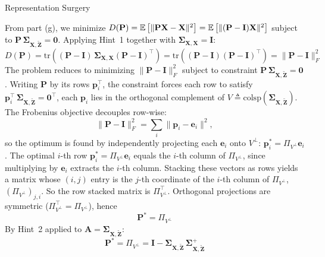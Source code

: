 \begin{question}{Representation Surgery}
\begin{subquestion}
From part (g), we minimize $D(\mathbf{P}) = \expectation\left[\|\mathbf{P}\mathbf{X} - \mathbf{X}\|^2\right] = \expectation\left[\|(\mathbf{P} - \mathbf{I})\mathbf{X}\|^2\right]$ subject to $\mathbf{P}\, \boldsymbol{\Sigma}_{\mathbf{X}, \widetilde{\mathbf{Z}}} = \mathbf{0}$. Applying Hint~1 together with $\boldsymbol{\Sigma}_{\mathbf{X}, \mathbf{X}} = \mathbf{I}$:
\begin{equation}
    D(\mathbf{P}) = \mathrm{tr}\!\left((\mathbf{P} - \mathbf{I})\, \boldsymbol{\Sigma}_{\mathbf{X}, \mathbf{X}} (\mathbf{P} - \mathbf{I})^\top\right) = \mathrm{tr}\!\left((\mathbf{P} - \mathbf{I})(\mathbf{P} - \mathbf{I})^\top\right) = \|\mathbf{P} - \mathbf{I}\|_F^2
\end{equation}
The problem reduces to minimizing $\|\mathbf{P} - \mathbf{I}\|_F^2$ subject to constraint $\mathbf{P}\, \boldsymbol{\Sigma}_{\mathbf{X}, \widetilde{\mathbf{Z}}} = \mathbf{0}$.
Writing $\mathbf{P}$ by its rows $\mathbf{p}_i^\top$, the constraint forces each row to satisfy $\mathbf{p}_i^\top\, \boldsymbol{\Sigma}_{\mathbf{X}, \widetilde{\mathbf{Z}}} = \mathbf{0}^\top$, each $\mathbf{p}_i$ lies in the orthogonal complement of $V \triangleq \mathrm{colsp}(\boldsymbol{\Sigma}_{\mathbf{X}, \widetilde{\mathbf{Z}}})$. 
The Frobenius objective decouples row-wise:
\begin{equation}
    \|\mathbf{P} - \mathbf{I}\|_F^2 = \sum_i \|\mathbf{p}_i - \mathbf{e}_i\|^2,
\end{equation}
so the optimum is found by independently projecting each $\mathbf{e}_i$ onto $V^\perp$: $\mathbf{p}_i^\ast = \Pi_{V^\perp} \mathbf{e}_i$. 
The optimal $i$-th row $\mathbf{p}_i^\ast = \Pi_{V^\perp} \mathbf{e}_i$ equals the $i$-th column of $\Pi_{V^\perp}$, since multiplying by $\mathbf{e}_i$ extracts the $i$-th column. 
Stacking these vectors as rows yields a matrix whose $(i, j)$ entry is the $j$-th coordinate of the $i$-th column of $\Pi_{V^\perp}$, $(\Pi_{V^\perp})_{j, i}$. 
So the row stacked matrix is $\Pi_{V^\perp}^\top$. 
Orthogonal projections are symmetric ($\Pi_{V^\perp}^\top = \Pi_{V^\perp}$), hence
\begin{equation}
    \mathbf{P}^\ast = \Pi_{V^\perp}
\end{equation}
By Hint~2 applied to $\mathbf{A} = \boldsymbol{\Sigma}_{\mathbf{X}, \widetilde{\mathbf{Z}}}$:
\begin{equation}
    \mathbf{P}^\ast = \Pi_{V^\perp} = \mathbf{I} - \boldsymbol{\Sigma}_{\mathbf{X}, \widetilde{\mathbf{Z}}}\, \boldsymbol{\Sigma}_{\mathbf{X}, \widetilde{\mathbf{Z}}}^+
\end{equation}


\end{subquestion}
\end{question}
